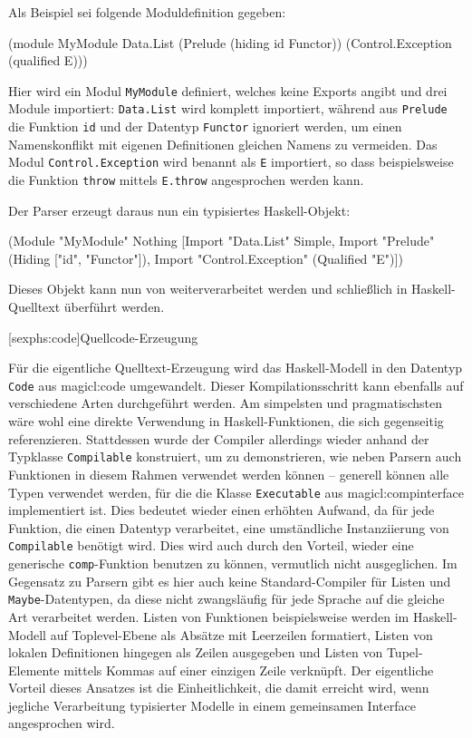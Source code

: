 \documentclass[11pt, a4paper, bibgerm]{scrbook}
\newenvironment{DIFnomarkup}{}{}
\newcommand\icode[1]{\lstinline?#1?}
\newcommand\lsection{}
\newcommand\sref{}
\begin{document}
Als Beispiel sei folgende Moduldefinition gegeben:
\begin{DIFnomarkup}\begin{code}
(module MyModule
  Data.List
  (Prelude (hiding id Functor))
  (Control.Exception (qualified E)))
\end{code}\end{DIFnomarkup}
Hier wird ein Modul \icode{MyModule} definiert, welches keine Exports
angibt und drei Module importiert: \icode{Data.List} wird komplett
importiert, während aus \icode{Prelude} die Funktion \icode{id} und der
Datentyp \icode{Functor} ignoriert werden, um einen Namenskonflikt mit
eigenen Definitionen gleichen Namens zu vermeiden. Das Modul
\icode{Control.Exception} wird benannt als \icode{E} importiert, so dass
beispielsweise die Funktion \icode{throw} mittels \icode{E.throw}
angesprochen werden kann.

Der Parser erzeugt daraus nun ein typisiertes Haskell-Objekt:
\begin{DIFnomarkup}\begin{code}
(Module "MyModule"
         Nothing
         [Import "Data.List" Simple,
          Import "Prelude" (Hiding ["id", "Functor"]),
          Import "Control.Exception" (Qualified "E")])
\end{code}\end{DIFnomarkup}
Dieses Objekt kann nun von weiterverarbeitet werden und schließlich in
Haskell-Quelltext überführt werden.

\lsection[sexphs:code]{Quellcode-Erzeugung}

Für die eigentliche Quelltext-Erzeugung wird das Haskell-Modell in den
Datentyp \icode{Code} aus \sref{magicl:code} umgewandelt. Dieser
Kompilationsschritt kann ebenfalls auf verschiedene Arten durchgeführt
werden. Am simpelsten und pragmatischsten wäre wohl eine direkte
Verwendung in Haskell-Funktionen, die sich gegenseitig
referenzieren. Stattdessen wurde der Compiler allerdings wieder
anhand der Typklasse \icode{Compilable} konstruiert, um zu
demonstrieren, wie neben Parsern auch Funktionen in diesem Rahmen
verwendet werden können -- generell können alle Typen verwendet werden,
für die die Klasse \icode{Executable} aus \sref{magicl:compinterface}
implementiert ist. Dies bedeutet wieder einen erhöhten Aufwand, da für
jede Funktion, die einen Datentyp verarbeitet, eine umständliche
Instanziierung von \icode{Compilable} benötigt wird. Dies wird auch
durch den Vorteil, wieder eine generische \icode{comp}-Funktion
benutzen zu können, vermutlich nicht ausgeglichen. Im Gegensatz zu
Parsern gibt es hier auch keine Standard-Compiler für Listen und
\icode{Maybe}-Datentypen, da diese nicht zwangsläufig für jede Sprache
auf die gleiche Art verarbeitet werden. Listen von Funktionen
beispielsweise werden im Haskell-Modell auf Toplevel-Ebene als Absätze
mit Leerzeilen formatiert, Listen von lokalen Definitionen hingegen
als Zeilen ausgegeben und Listen von Tupel-Elemente mittels Kommas
auf einer einzigen Zeile verknüpft. Der eigentliche Vorteil dieses
Ansatzes ist die Einheitlichkeit, die damit erreicht wird, wenn
jegliche Verarbeitung typisierter Modelle in einem gemeinsamen
Interface angesprochen wird.
\end{document}
